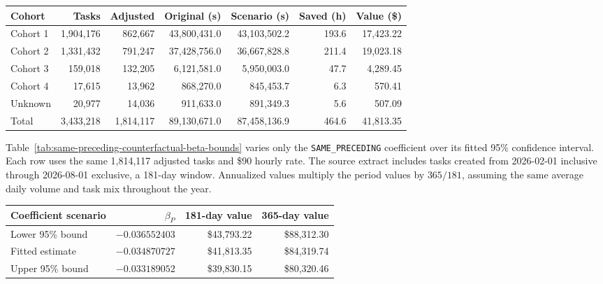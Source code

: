 \begin{center}
\small
\setlength{\tabcolsep}{3pt}
\begin{tabular}{@{}lrrrrrr@{}}
\toprule
Cohort & Tasks & Adjusted & Original (s) & Scenario (s) & Saved (h) & Value (\$) \\
\midrule
Cohort 1 & 1,904,176 & 862,667 & 43,800,431.0 & 43,103,502.2 & 193.6 & 17,423.22 \\
Cohort 2 & 1,331,432 & 791,247 & 37,428,756.0 & 36,667,828.8 & 211.4 & 19,023.18 \\
Cohort 3 & 159,018 & 132,205 & 6,121,581.0 & 5,950,003.0 & 47.7 & 4,289.45 \\
Cohort 4 & 17,615 & 13,962 & 868,270.0 & 845,453.7 & 6.3 & 570.41 \\
Unknown & 20,977 & 14,036 & 911,633.0 & 891,349.3 & 5.6 & 507.09 \\
\midrule
Total & 3,433,218 & 1,814,117 & 89,130,671.0 & 87,458,136.9 & 464.6 & 41,813.35 \\
\bottomrule
\end{tabular}
\label{tab:same-preceding-counterfactual-cohorts}
\end{center}

Table~\ref{tab:same-preceding-counterfactual-beta-bounds} varies only the
\texttt{SAME\_PRECEDING} coefficient over its fitted 95\% confidence interval.
Each row uses the same 1,814,117 adjusted tasks and \$90 hourly rate.
The source extract includes tasks created from 2026-02-01 inclusive through
2026-08-01 exclusive, a 181-day window. Annualized values multiply the period values by
$365/181$, assuming the same average daily volume and task mix throughout the year.

\begin{center}
\begin{tabular}{@{}lrrr@{}}
\toprule
Coefficient scenario & $\beta_P$ & 181-day value & 365-day value \\
\midrule
Lower 95\% bound & $-0.036552403$ & \$43,793.22 & \$88,312.30 \\
Fitted estimate & $-0.034870727$ & \$41,813.35 & \$84,319.74 \\
Upper 95\% bound & $-0.033189052$ & \$39,830.15 & \$80,320.46 \\
\bottomrule
\end{tabular}
\label{tab:same-preceding-counterfactual-beta-bounds}
\end{center}

